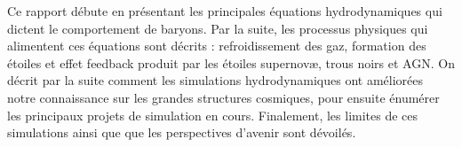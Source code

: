 \documentclass{article}
\begin{document}
Ce rapport débute en présentant les principales équations hydrodynamiques qui dictent le comportement de baryons. Par la suite, les processus physiques  qui alimentent ces équations sont décrits : refroidissement des gaz, formation des étoiles et effet feedback produit par les étoiles supernovæ, trous noirs et AGN.  On décrit par la suite comment les simulations hydrodynamiques ont améliorées notre connaissance sur les grandes structures cosmiques, pour ensuite énumérer les principaux projets de simulation en cours. Finalement, les limites de ces simulations  ainsi que que les perspectives d'avenir sont dévoilés. 

\\







\end{document}
